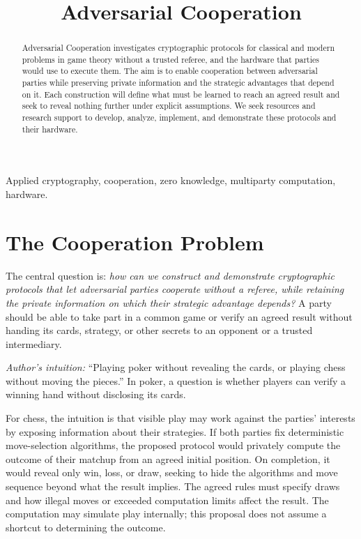 \documentclass[conference,letterpaper]{IEEEtran}
\title{Adversarial Cooperation}
\author{\IEEEauthorblockN{Santiago Restrepo}
\IEEEauthorblockA{\href{mailto:contact@waajacu.com}{contact@waajacu.com}\quad
\url{https://waajacu.com/}\\[3pt]
\textit{Research proposal --- September 2026}}}
\date{}
\begin{document}
\maketitle

\begin{abstract}
Adversarial Cooperation investigates cryptographic protocols for classical
and modern problems in game theory without a trusted referee, and the
hardware that parties would use to execute them. The aim is to enable
cooperation between adversarial parties while preserving private information
and the strategic advantages that depend on it. Each construction will
define what must be learned to reach an agreed result and seek to reveal
nothing further under explicit assumptions. We seek resources and research
support to develop, analyze, implement, and demonstrate these protocols and
their hardware.
\end{abstract}

\begin{IEEEkeywords}
Applied cryptography, cooperation, zero knowledge, multiparty computation,
hardware.
\end{IEEEkeywords}

\section{The Cooperation Problem}
The central question is: \emph{how can we construct and demonstrate
cryptographic protocols that let adversarial parties cooperate without a
referee, while retaining the private information on which their strategic
advantage depends?} A party should be able to take part in a common game or
verify an agreed result without handing its cards, strategy, or other secrets
to an opponent or a trusted intermediary.

\emph{Author's intuition:} ``Playing poker without revealing the cards, or
playing chess without moving the pieces.'' In poker, a question is whether
players can verify a winning hand without disclosing its cards.

For chess, the intuition is that visible play may work against the parties'
interests by exposing information about their strategies. If both parties
fix deterministic move-selection algorithms, the proposed protocol would
privately compute the outcome of their matchup from an agreed initial
position. On completion, it would reveal only win, loss, or draw, seeking to
hide the algorithms and move sequence beyond what the result implies. The
agreed rules must specify draws and how illegal moves or exceeded computation
limits affect the result. The computation may simulate play internally; this
proposal does not assume a shortcut to determining the outcome.
\end{document}
